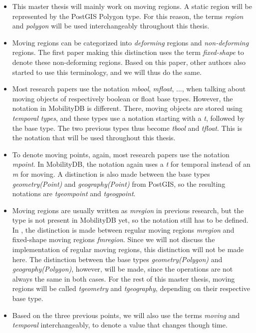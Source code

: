 \begin{itemize}
    \item This master thesis will mainly work on moving regions. A static region will be represented by the PostGIS Polygon type. For this reason, the terms \textit{region} and \textit{polygon} will be used interchangeably throughout this thesis.

    \item Moving regions can be categorized into \textit{deforming} regions and \textit{non-deforming} regions. The first paper \cite{fmregion} making this distinction uses the term \textit{fixed-shape} to denote these non-deforming regions. Based on this paper, other authors \cite{modeling_and_representing,polyhedra} also started to use this terminology, and we will thus do the same.

    \item Most research papers use the notation \textit{mbool}, \textit{mfloat}, ..., when talking about moving objects of respectively boolean or float base types. However, the notation in MobilityDB is different. There, moving objects are stored using \textit{temporal types}, and these types use a notation starting with a \textit{t}, followed by the base type. The two previous types thus become \textit{tbool} and \textit{tfloat}. This is the notation that will be used throughout this thesis.

    \item To denote moving points, again, most research papers use the notation \textit{mpoint}. In MobilityDB, the notation again uses a \textit{t} for temporal instead of an \textit{m} for moving. A distinction is also made between the base types \textit{geometry(Point)} and \textit{geography(Point)} from PostGIS, so the resulting notations are \textit{tgeompoint} and \textit{tgeogpoint}.

    \item Moving regions are usually written as \textit{mregion} in previous research, but the type is not present in MobilityDB yet, so the notation still has to be defined. In \cite{fmregion}, the distinction is made between regular moving regions \textit{mregion} and fixed-shape moving regions \textit{fmregion}. Since we will not discuss the implementation of regular moving regions, this distinction will not be made here. The distinction between the base types \textit{geometry(Polygon)} and \textit{geography(Polygon)}, however, will be made, since the operations are not always the same in both cases. For the rest of this master thesis, moving regions will be called \textit{tgeometry} and \textit{tgeography}, depending on their respective base type.

    \item Based on the three previous points, we will also use the terms \textit{moving} and \textit{temporal} interchangeably, to denote a value that changes though time.
\end{itemize}